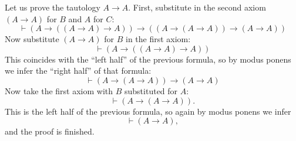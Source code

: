 

\setcounter{section}{2}
\setcounter{subsection}{2}
\setcounter{dfn}{4}

\begin{exl}
Let us prove the tautology $A \to A$.
First, substitute in the second axiom $(A \to A)$ for $B$ and $A$ for $C$:
\[
\vdash (A \to ((A \to A) \to A)) \to ((A \to (A \to A)) \to (A \to A))
\]
Now substitute $(A \to A)$ for $B$ in the first axiom:
\[
\vdash (A \to ((A \to A) \to A))
\]
This coincides with the ``left half'' of the previous formula, so by modus ponens we infer the ``right half'' of that formula:
\[
\vdash (A \to (A \to A)) \to (A \to A)
\]
Now take the first axiom with $B$ substituted for $A$:
\[
\vdash (A \to (A \to A)).
\]
This is the left half of the previous formula, so again by modus ponens we infer
\[
\vdash (A \to A),
\]
and the proof is finished.
\end{exl}


